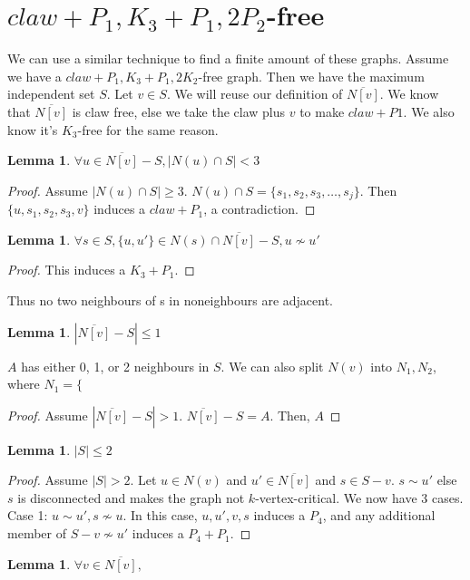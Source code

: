 \documentclass[11pt]{article}
\newtheorem{lemma}[theorem]{Lemma}
\theoremstyle{definition}
\newcommand{\noneighbs}{\overline{N[v]}}
\begin{document}
\section{$claw + P_1, K_3 + P_1, 2P_2$-free}
We can use a similar technique to find a finite amount of these graphs. Assume we have a $claw + P_1, K_3 + P_1, 2K_2$-free graph. Then we have the maximum independent set $S$. Let $v \in S$. We will reuse our definition of $\noneighbs$.
We know that $\noneighbs$ is claw free, else we take the claw plus $v$ to make $claw + P1$. We also know it's $K_3$-free for the same reason.
\begin{lemma}\label{lem:clawindependent}
$\forall u \in \noneighbs - S, |N(u) \cap S| < 3$ 
\end{lemma}
\begin{proof}
Assume $|N(u) \cap S| \geq 3$. $N(u) \cap S = \{s_1, s_2, s_3, \dots, s_j\}$. Then $\{u, s_1, s_2, s_3, v\}$ induces a $claw + P_1$, a contradiction.
\end{proof}
\begin{lemma}\label{lem:trianglestuff}
$\forall s \in S, \{u, u'\} \in N(s) \cap \noneighbs - S, u \not \sim u'$
\end{lemma}
\begin{proof}
This induces a $K_3 + P_1$.
\end{proof}
Thus no two neighbours of s in noneighbours are adjacent.
\begin{lemma}\label{lem:juicebox}
$|\noneighbs - S| \leq 1$
\end{lemma}
$A$ has either 0, 1, or 2 neighbours in $S$.
We can also split $N(v)$ into $N_1, N_2$, where $N_1 = \{$
\begin{proof}
Assume $|\noneighbs - S| > 1$. $\noneighbs - S = A$. Then, $A$
\end{proof}
\begin{lemma}\label{lem:indset}
$|S| \leq 2$
\end{lemma}
\begin{proof}
Assume $|S| > 2$. Let $u \in N(v)$ and $u' \in \noneighbs$ and $s \in S - v$. $s \sim u'$ else $s$ is disconnected and makes the graph not $k$-vertex-critical. We now have 3 cases.
Case 1: $u \sim u', s \not \sim u$. In this case, $u, u', v, s$ induces a $P_4$, and any additional member of $S - v \not \sim u'$ induces a $P_4 + P_1$.
\end{proof}
\begin{lemma}\label{lem:clawminset}
$\forall v \in \noneighbs, $
\end{lemma}
\end{document}
